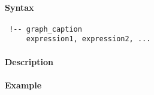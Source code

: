


	\paragraph{Syntax}
 
 \begin{verbatim}
 !-- graph_caption
     expression1, expression2, ...
 \end{verbatim}
 
 \paragraph{Description}
 
 \paragraph{Example}


